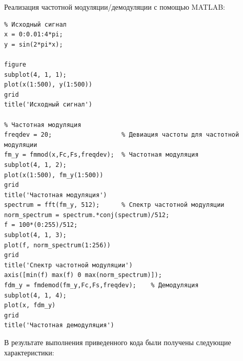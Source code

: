 \documentclass[10pt,a4paper]{article}
\begin{document}
Реализация частотной модуляции/демодуляции с помощью MATLAB:
\begin{verbatim}
% Исходный сигнал
x = 0:0.01:4*pi;
y = sin(2*pi*x);

figure
subplot(4, 1, 1);
plot(x(1:500), y(1:500))
grid
title('Исходный сигнал')
 
% Частотная модуляция
freqdev = 20;                	% Девиация частоты для частотной модуляции
fm_y = fmmod(x,Fc,Fs,freqdev); 	% Частотная модуляция
subplot(4, 1, 2);
plot(x(1:500), fm_y(1:500))
grid
title('Частотная модуляция')
spectrum = fft(fm_y, 512);      % Спектр частотной модуляции
norm_spectrum = spectrum.*conj(spectrum)/512;  
f = 100*(0:255)/512;
subplot(4, 1, 3);
plot(f, norm_spectrum(1:256))
grid
title('Спектр частотной модуляции')
axis([min(f) max(f) 0 max(norm_spectrum)]);
fdm_y = fmdemod(fm_y,Fc,Fs,freqdev); 	% Демодуляция
subplot(4, 1, 4);
plot(x, fdm_y)
grid
title('Частотная демодуляция')

\end{verbatim}


В результате выполнения приведенного кода были получены следующие характеристики:
\end{document}
